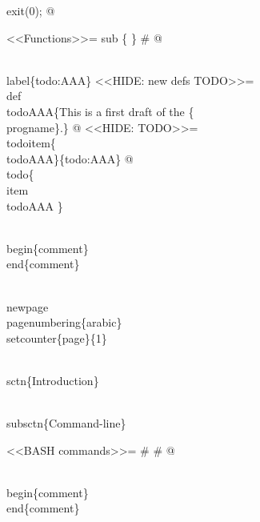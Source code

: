 \documentclass[11pt]{article}
\def\nwendcode{\endtrivlist \endgroup} %
\let\nwdocspar=\par                    %
\begin{document}
exit(0);
@

<<Functions>>=
sub \{
\} # 
@

\\label\{todo:AAA\}
<<HIDE: new defs TODO>>=
\\def\\todoAAA\{This is a first draft of the \{\\progname\}.\} %
@
<<HIDE: TODO>>=
\\todoitem\{\\todoAAA\}\{todo:AAA\}
@
\\todo\{ \\item \\todoAAA \} %

\\begin\{comment\}
\\end\{comment\}

\nwendcode{}\nwdocspar

\nwenddocs{}\endmoddef

\\newpage
\\pagenumbering\{arabic\}
\\setcounter\{page\}\{1\}

\\sctn\{Introduction\}

\\subsctn\{Command-line\}

<<BASH commands>>=
#
#
@

\\begin\{comment\}
\\end\{comment\}

\nwendcode{}\nwdocspar

\nwenddocs{}\endmoddef

% 
\end{document}
